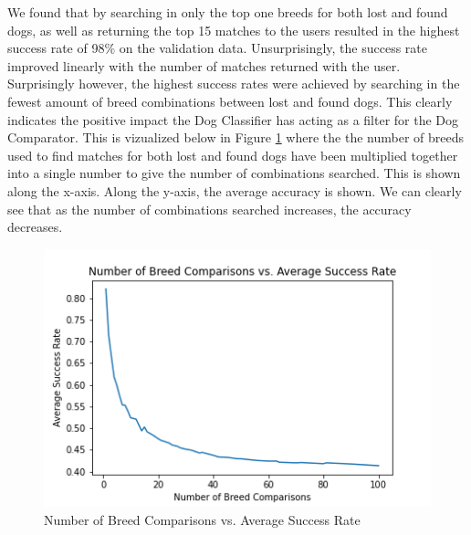 \documentclass{article}
\begin{document}
We found that by searching in only the top one breeds for both lost and found dogs, as well as returning the top 15 matches to the users resulted in the highest success rate of 98\% on the validation data.  Unsurprisingly, the success rate improved linearly with the number of matches returned with the user.  Surprisingly however, the highest success rates were achieved by searching in the fewest amount of breed combinations between lost and found dogs.  This clearly indicates the positive impact the Dog Classifier has acting as a filter for the Dog Comparator.  This is vizualized below in Figure \ref{fig:x breed comparisons} where the the number of breeds used to find matches for both lost and found dogs have been multiplied together into a single number to give the number of combinations searched.  This is shown along the x-axis.  Along the y-axis, the average accuracy is shown.  We can clearly see that as the number of combinations searched increases, the accuracy decreases.

\begin{figure}[]
\centering
	\includegraphics[scale=0.7]{final-report-images/num_breed_comparison_accuracy.png}
\caption{Number of Breed Comparisons vs. Average Success Rate}
\label{fig:x breed comparisons}
\end{figure}
\end{document}
